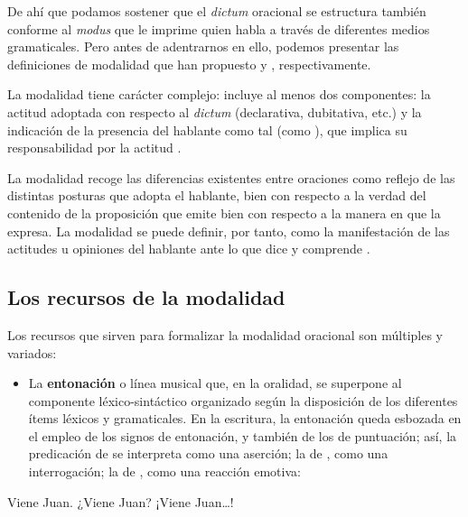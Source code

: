 De ahí que podamos sostener que el \textit{dictum} oracional se estructura
también conforme al \textit{modus} que le imprime quien habla a través de
diferentes medios gramaticales. Pero antes de adentrarnos en ello, podemos
presentar las definiciones de modalidad que han propuesto
\textcite{kovacci1992} y \textcite{rodriguezramalle2005}, respectivamente.

\begin{cita}
La modalidad tiene carácter complejo: incluye al menos dos componentes: la
actitud adoptada con respecto al \textit{dictum} (declarativa, dubitativa, etc.)
y la indicación de la presencia del hablante como tal (como ), que
implica su responsabilidad por la actitud \parencite[99]{kovacci1992}.
\end{cita}

\begin{cita}
La modalidad recoge las diferencias existentes entre oraciones como reflejo de
las distintas posturas que adopta el hablante, bien con respecto a la verdad del
contenido de la proposición que emite bien con respecto a la manera en que la
expresa. La modalidad se puede definir, por tanto, como la manifestación de las
actitudes u opiniones del hablante ante lo que dice y comprende
\parencite[470]{rodriguezramalle2005}.
\end{cita}

\subsection{Los recursos de la modalidad}\label{sec:14-recursos}

Los recursos que sirven para formalizar la modalidad oracional son múltiples y
variados:

\begin{itemize}
  \item La \textbf{entonación} o línea musical que, en la oralidad, se superpone
        al componente léxico-sintáctico organizado según la disposición de los
        diferentes ítems léxicos y gramaticales. En la escritura, la entonación
        queda esbozada en el empleo de los signos de entonación, y también de los
        de puntuación; así, la predicación de  se interpreta
        como una aserción; la de , como una interrogación; la
        de , como una reacción emotiva:
\end{itemize}

\begin{exe}
  \ex\label{ex:14-juan1} Viene Juan.
  \ex\label{ex:14-juan2} ¿Viene Juan?
  \ex\label{ex:14-juan3} ¡Viene Juan\ldots!
\end{exe}

